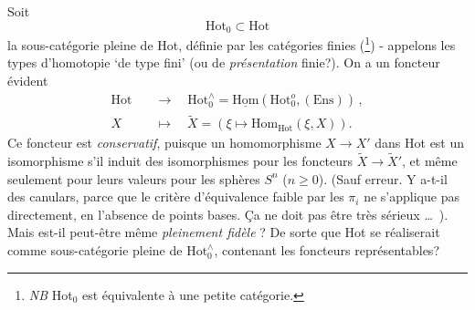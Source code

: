 \documentclass[11pt]{article}
\newcommand{\printedpage}[1]{\marginpar{\footnotesize p.~#1}}
\newcommand{\msp}[1]{\marginpar{\footnotesize [#1]}}
\newcommand{\Hot}{\mathrm{Hot}}
\newcommand{\uHom}{\underline{\mathrm{Hom}}}
\newcommand{\Hom}{\mathrm{Hom}}
\newcommand{\Ens}{\mathrm{Ens}}
\begin{document}
Soit
\[
\Hot_0 \subset \Hot
\]
\printedpage{32}
la sous-catégorie pleine de Hot, définie par les catégories finies (\footnote[9]{\textit{NB} Hot$_0$ est équivalente à une petite catégorie.}) - appelons les types d'homotopie `de type fini' (ou de \textit{présentation} finie?). On a un foncteur évident
\msp{page 52}
\[
\begin{aligned}
\Hot \quad &\longrightarrow \quad \Hot_0^{\wedge} = \uHom(\Hot_0^{o}, (\Ens)) \, ,\\
X \quad &\longmapsto \quad \tilde{X} = (\xi \longmapsto \Hom_{\Hot}(\xi, X)).
\end{aligned}
\]
Ce foncteur est \textit{conservatif}, puisque un homomorphisme $X \longrightarrow X'$ dans Hot est un isomorphisme s'il induit des isomorphismes pour les foncteurs $\tilde{X} \longrightarrow \tilde{X}'$, et même seulement pour leurs valeurs pour les sphères $S^n$ ($n \geq 0$). (Sauf erreur. Y a-t-il des canulars, parce que le critère d'équivalence faible par les $\pi_i$ ne s'applique pas directement, en l'absence de points bases. Ça ne doit pas être très sérieux \ldots\ ). Mais est-il peut-être même \textit{pleinement fidèle} ? De sorte que Hot se réaliserait comme sous-catégorie pleine de $\Hot_0^{\wedge}$, contenant les foncteurs représentables?
\end{document}
